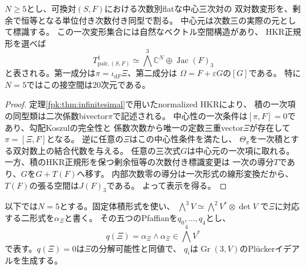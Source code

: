 \begin{proposition}[次数付き中心三次対の一次接空間]
\label{fpk:prop:tangent-pair}
$N\ge5$とし、可換対$(S,F)$における次数別flatな中心三次対の
双対数変形を、剰余で恒等となる単位付き次数付き同型で割る。
中心元は次数三の実際の元として標識する。
この一次変形集合には自然なベクトル空間構造があり、
HKR正規形を選べば
\begin{equation}\label{fpk:eq:tangent-pair}
 T^1_{\mathrm{pair},(S,F)}
 \simeq
 \bigwedge^3\mathbb C^N\oplus\operatorname{Jac}(F)_3
\end{equation}
と表される。第一成分は$\pi=\iota_{dF}\Xi$、第二成分は
$\Omega=F+\varepsilon G$の$[G]$である。
特に$N=5$ではこの接空間は$20$次元である。
\end{proposition}
\begin{proof}
定理\ref{fpk:thm:infinitesimal}で用いたnormalized HKRにより、
積の一次項の同型類は二次係数bivector$\pi$で記述される。
中心性の一次条件は$[\pi,F]=0$であり、勾配Koszulの完全性と
係数次数から唯一の定数三重vector$\Xi$が存在して$\pi=[\Xi,F]$となる。
逆に任意の$\Xi$はこの中心性条件を満たし、
$\Theta_\pi$を一次積とする双対数上の結合代数を与える。
任意の三次式$G$は中心元の一次項に取れる。
一方、積のHKR正規形を保つ剰余恒等の次数付き標識変更は
一次の導分$T$であり、$G$を$G+T(F)$へ移す。
内部次数零の導分は一次形式の線形変換だから、
$T(F)$の張る空間は$J(F)_3$である。
よって表示を得る。
\end{proof}

以下では$N=5$とする。固定体積形式を使い、
$\bigwedge^3V\simeq\bigwedge^2V^*\otimes\det V$
で$\Xi$に対応する二形式を$\alpha_\Xi$と書く。
その五つのPfaffianを$q_0,\ldots,q_4$とし、
\[
 q(\Xi)=\alpha_\Xi\wedge\alpha_\Xi
 \in\bigwedge^4V^*
\]
で表す。$q(\Xi)=0$は$\Xi$の分解可能性と同値で、
$q_i$は$\operatorname{Gr}(3,V)$のPl\"uckerイデアルを生成する。


